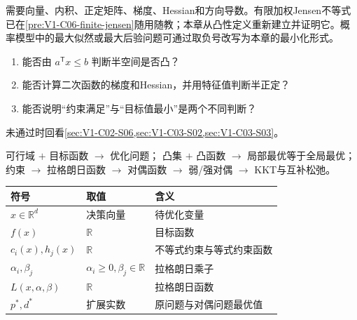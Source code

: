 \label{struct:V1-C07-CH02}
\begin{prerequisitebox}
需要向量、内积、正定矩阵、梯度、Hessian和方向导数。有限加权Jensen不等式已在\cref{pre:V1-C06-finite-jensen}随用随教；本章从凸性定义重新建立并证明它。概率模型中的最大似然或最大后验问题可通过取负号改写为本章的最小化形式。
\end{prerequisitebox}

\label{struct:V1-C07-CH03}
\begin{precheckbox}
\begin{enumerate}[leftmargin=2.2em]
  \item 能否由 $a^{\mathsf T}x\le b$ 判断半空间是否凸？
  \item 能否计算二次函数的梯度和Hessian，并用特征值判断半正定？
  \item 能否说明“约束满足”与“目标值最小”是两个不同判断？
\end{enumerate}
未通过时回看\cref{sec:V1-C02-S06,sec:V1-C03-S02,sec:V1-C03-S03}。
\end{precheckbox}

\label{struct:V1-C07-CH04}
\begin{dependencybox}
可行域 $+$ 目标函数 $\to$ 优化问题；
凸集 $+$ 凸函数 $\to$ 局部最优等于全局最优；
约束 $\to$ 拉格朗日函数 $\to$ 对偶函数 $\to$ 弱/强对偶 $\to$ KKT与互补松弛。
\end{dependencybox}

\label{struct:V1-C07-CH05}
\begin{symboltablebox}
\begin{tabularx}{\linewidth}{@{}l l X@{}}
\toprule 符号 & 取值 & 含义\\ \midrule
$x\in\mathbb R^d$ & 决策向量 & 待优化变量\\
$f(x)$ & $\mathbb R$ & 目标函数\\
$c_i(x),h_j(x)$ & $\mathbb R$ & 不等式约束与等式约束函数\\
$\alpha_i,\beta_j$ & $\alpha_i\ge0,\beta_j\in\mathbb R$ & 拉格朗日乘子\\
$L(x,\alpha,\beta)$ & $\mathbb R$ & 拉格朗日函数\\
$p^*,d^*$ & 扩展实数 & 原问题与对偶问题最优值\\
\bottomrule
\end{tabularx}
\end{symboltablebox}

